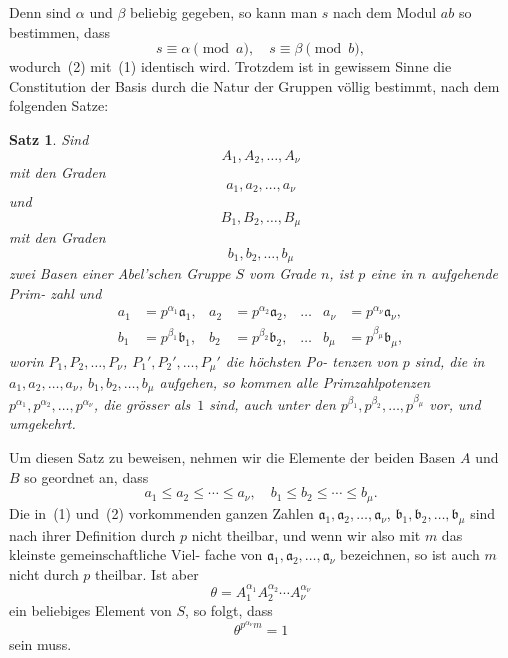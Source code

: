\documentclass[12pt,a4paper]{article}
\theoremstyle{plain}
\newtheorem{satz}{Satz}[section]
\theoremstyle{definition}
\theoremstyle{remark}
\begin{document}
Denn sind $\alpha$ und $\beta$ beliebig gegeben, so kann man $s$ nach
dem Modul $ab$ so bestimmen, dass
\[
s \equiv \alpha \pmod{a}, \quad s \equiv \beta \pmod{b},
\]
wodurch~(2) mit~(1) identisch wird. Trotzdem ist in gewissem
Sinne die Constitution der Basis durch die Natur der Gruppen
völlig bestimmt, nach dem folgenden Satze:

\begin{satz} %
Sind
\[
A_1, A_2, \ldots, A_\nu
\]
mit den Graden
\[
a_1, a_2, \ldots, a_\nu
\]
und
\[
B_1, B_2, \ldots, B_\mu
\]
mit den Graden
\[
b_1, b_2, \ldots, b_\mu
\]
zwei Basen einer Abel'schen Gruppe $S$ vom
Grade $n$, ist $p$ eine in $n$ aufgehende Prim-
zahl und
\begin{align}\tag{1}
a_1 &= p^{\alpha_1} \mathfrak{a}_1, & a_2 &= p^{\alpha_2} \mathfrak{a}_2, & \ldots & a_\nu &= p^{\alpha_\nu} \mathfrak{a}_\nu,\\\tag{2}
b_1 &= p^{\beta_1} \mathfrak{b}_1, & b_2 &= p^{\beta_2} \mathfrak{b}_2, & \ldots & b_\mu &= p^{\beta_\mu} \mathfrak{b}_\mu,
\end{align}
worin $P_1, P_2, \ldots, P_\nu$, $P_1', P_2', \ldots, P_\mu'$ die höchsten Po-
tenzen von $p$ sind, die in $a_1, a_2, \ldots, a_\nu$, $b_1, b_2, \ldots, b_\mu$
aufgehen, so kommen alle Primzahlpotenzen
$p^{\alpha_1}, p^{\alpha_2}, \ldots, p^{\alpha_\nu}$, die grösser als~$1$ sind, auch unter
den $p^{\beta_1}, p^{\beta_2}, \ldots, p^{\beta_\mu}$ vor, und umgekehrt.
\end{satz}

Um diesen Satz zu beweisen, nehmen wir die Elemente der
beiden Basen $A$ und $B$ so geordnet an, dass
\begin{equation}\tag{3}
a_1 \leq a_2 \leq \cdots \leq a_\nu, \quad b_1 \leq b_2 \leq \cdots \leq b_\mu.
\end{equation}
Die in~(1) und~(2) vorkommenden ganzen Zahlen $\mathfrak{a}_1, \mathfrak{a}_2, \ldots, \mathfrak{a}_\nu$,
$\mathfrak{b}_1, \mathfrak{b}_2, \ldots, \mathfrak{b}_\mu$ sind nach ihrer Definition durch $p$ nicht theilbar,
und wenn wir also mit $m$ das kleinste gemeinschaftliche Viel-
fache von $\mathfrak{a}_1, \mathfrak{a}_2, \ldots, \mathfrak{a}_\nu$ bezeichnen, so ist auch $m$ nicht durch $p$
theilbar. Ist aber
\begin{equation}\tag{4}
\theta = A_1^{\alpha_1} A_2^{\alpha_2} \cdots A_\nu^{\alpha_\nu}
\end{equation}
ein beliebiges Element von $S$, so folgt, dass
\[
\theta^{p^{\alpha_\nu} m} = 1
\]
sein muss.
\end{document}
